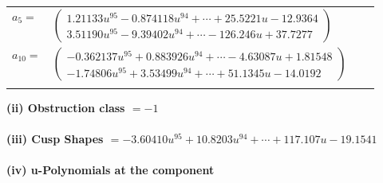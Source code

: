 \documentclass[1p]{elsarticle_modified}
\theoremstyle{definition}
\begin{document}
\begin{tabular}{m{7pt} m{180pt} m{7pt} m{180pt} }
\flushright $a_{5}=$&$\begin{pmatrix}1.21133 u^{95}-0.874118 u^{94}+\cdots+25.5221 u-12.9364\\3.51190 u^{95}-9.39402 u^{94}+\cdots-126.246 u+37.7277\end{pmatrix}$ \\
\flushright $a_{10}=$&$\begin{pmatrix}-0.362137 u^{95}+0.883926 u^{94}+\cdots-4.63087 u+1.81548\\-1.74806 u^{95}+3.53499 u^{94}+\cdots+51.1345 u-14.0192\end{pmatrix}$\\&\end{tabular}
\flushleft \textbf{(ii) Obstruction class $= -1$}\\~\\
\flushleft \textbf{(iii) Cusp Shapes $= -3.60410 u^{95}+10.8203 u^{94}+\cdots+117.107 u-19.1541$}\\~\\
\newpage\renewcommand{\arraystretch}{1}
\flushleft \textbf{(iv) u-Polynomials at the component}\newline \\
\end{document}
